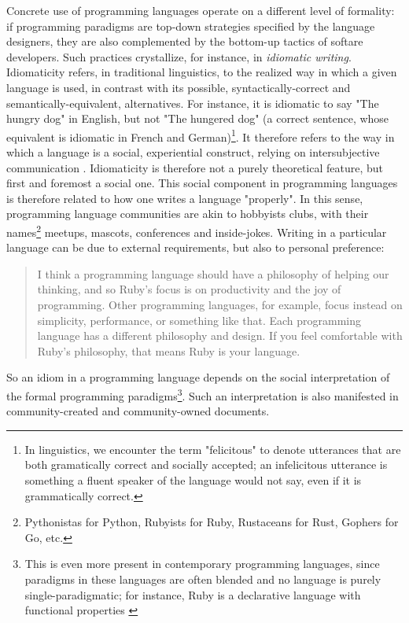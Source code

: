 Concrete use of programming languages operate on a different level of formality: if programming paradigms are top-down strategies specified by the language designers, they are also complemented by the bottom-up tactics of softare developers. Such practices crystallize, for instance, in \emph{idiomatic writing}. Idiomaticity refers, in traditional linguistics, to the realized way in which a given language is used, in contrast with its possible, syntactically-correct and semantically-equivalent, alternatives. For instance, it is idiomatic to say "The hungry dog" in English, but not "The hungered dog" (a correct sentence, whose equivalent is idiomatic in French and German)\footnote{In linguistics, we encounter the term "felicitous" to denote utterances that are both gramatically correct and socially accepted; an
infelicitous utterance is something a fluent speaker of the language would not say, even if it is grammatically correct.}. It therefore refers to the way in which a language is a social, experiential construct, relying on intersubjective communication \citep{voloshinov_marxism_1986}. Idiomaticity is therefore not a purely theoretical feature, but first and foremost a social one. This social component in programming languages is therefore related to how one writes a language "properly". In this sense, programming language communities are akin to hobbyists clubs, with their names\footnote{Pythonistas for Python, Rubyists for Ruby, Rustaceans for Rust, Gophers for Go, etc.} meetups, mascots, conferences and inside-jokes. Writing in a particular language can be due to external requirements, but also to personal preference:

\begin{quote}
  I think a programming language should have a philosophy of helping our thinking, and so Ruby's focus is on productivity and the joy of programming. Other programming languages, for example, focus instead on simplicity, performance, or something like that. Each programming language has a different philosophy and design. If you feel comfortable with Ruby's philosophy, that means Ruby is your language. \citep{matsumoto_yukihiro_2019}
\end{quote}

So an idiom in a programming language depends on the social interpretation of the formal programming paradigms\footnote{This is even more present in contemporary programming languages, since paradigms in these languages are often blended and no language is purely single-paradigmatic; for instance, Ruby is a declarative language with functional properties \citep{kidd_why_2005}}. Such an interpretation is also manifested in community-created and community-owned documents.

